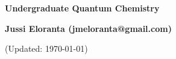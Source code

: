 \documentclass[serif]{beamer}
\begin{document}
\phantom{hauki}
\vfill
\begin{center}
\textbf{Undergraduate Quantum Chemistry}\\

\vspace{1cm}

\textbf{Jussi Eloranta (jmeloranta@gmail.com)}\\

\vspace{1cm}

{\tiny (Updated: \today)}

\end{center}
\vfill
\newpage








% 

%

%
\end{document}
